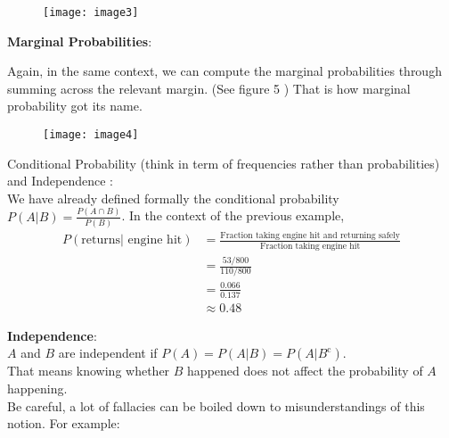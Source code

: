 \documentclass[12pt]{amsart}
\begin{document}
 \begin{figure}[t]
\texttt{[image: image3]}
\caption{}
\end{figure}
\newpage


{\bf Marginal Probabilities}:

Again, in the same context, we can compute the marginal probabilities through summing across the relevant margin. (See figure 5 )
That is how marginal probability got its name.

 \begin{figure}[t]
\texttt{[image: image4]}
\caption{}
\end{figure}

Conditional Probability (think in term of frequencies rather than probabilities) and Independence :\\
We have already defined formally the conditional probability $P(A|B)=\displaystyle\frac{P(A\cap B)}{P(B)}$. 
In the context of the previous example, \\

 \begin{equation} 
\begin{split}
P(\text{returns}|\text{ engine hit} )& = \frac{\text {Fraction taking engine hit and returning safely}}{\text{Fraction taking engine hit}}\\
& = \frac{53/800}{110/800} \\
& = \frac{0.066}{0.137}\\
& \approx 0.48
\end{split}
\end{equation}


{\bf Independence}:\\

$A$ and $B$ are independent if $P(A)=P(A|B)=P(A|B^{\mathrm{c}})$. \\
That means knowing whether $B$ happened does not affect the probability of $A$ happening.\\
Be careful, a lot of fallacies can be boiled down to misunderstandings of this notion. For example:\\
\end{document}

